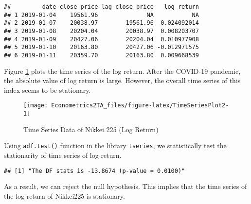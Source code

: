 \documentclass[
  12pt,
]{article}
\newenvironment{Shaded}{\begin{snugshade}}{\end{snugshade}}
\newcommand{\DataTypeTok}[1]{\textcolor[rgb]{0.13,0.29,0.53}{#1}}
\newcommand{\DecValTok}[1]{\textcolor[rgb]{0.00,0.00,0.81}{#1}}
\newcommand{\KeywordTok}[1]{\textcolor[rgb]{0.13,0.29,0.53}{\textbf{#1}}}
\newcommand{\NormalTok}[1]{#1}
\newcommand{\OperatorTok}[1]{\textcolor[rgb]{0.81,0.36,0.00}{\textbf{#1}}}
\newcommand{\StringTok}[1]{\textcolor[rgb]{0.31,0.60,0.02}{#1}}
\begin{document}
\begin{verbatim}
##         date close_price lag_close_price   log_return
## 1 2019-01-04    19561.96              NA           NA
## 2 2019-01-07    20038.97        19561.96  0.024092014
## 3 2019-01-08    20204.04        20038.97  0.008203707
## 4 2019-01-09    20427.06        20204.04  0.010977908
## 5 2019-01-10    20163.80        20427.06 -0.012971575
## 6 2019-01-11    20359.70        20163.80  0.009668539
\end{verbatim}

Figure \ref{fig:TimeSeriesPlot2} plots the time series of the log return.
After the COVID-19 pandemic, the absolute value of log return is large.
However, the overall time series of this index seems to be stationary.

\begin{figure}[h]

{\centering \texttt{[image: Econometrics2TA\_files/figure-latex/TimeSeriesPlot2-1]} 

}

\caption{Time Series Data of Nikkei 225 (Log Return)}\label{fig:TimeSeriesPlot2}
\end{figure}

Using \texttt{adf.test()} function in the library \texttt{tseries},
we statistically test the stationarity of time series of log return.

\begin{Shaded}
\end{Shaded}

\begin{verbatim}
## [1] "The DF stats is -13.8674 (p-value = 0.0100)"
\end{verbatim}

As a result, we can reject the null hypothesis.
This implies that the time series of the log return of Nikkei225 is stationary.
\end{document}
